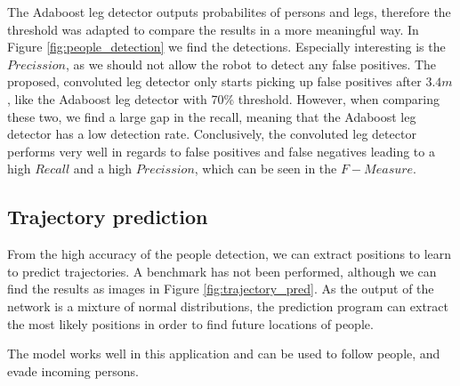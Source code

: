 The Adaboost leg detector outputs probabilites of persons and legs, therefore the threshold was adapted to compare the results in a more meaningful way. In Figure \ref{fig:people_detection} we find the detections. Especially interesting is the $Precission$, as we should not allow the robot to detect any false positives. The proposed, convoluted leg detector only starts picking up false positives after $3.4 m$, like the Adaboost leg detector with 70\% threshold. However, when comparing these two, we find a large gap in the recall, meaning that the Adaboost leg detector has a low detection rate.
Conclusively, the convoluted leg detector performs very well in regards to false positives and false negatives leading to a high $Recall$ and a high $Precission$, which can be seen in the $F-Measure$.


\subsection{Trajectory prediction}

From the high accuracy of the people detection, we can extract positions to learn to predict trajectories. A benchmark has not been performed, although we can find the results as images in Figure \ref{fig:trajectory_pred}. As the output of the network is a mixture of normal distributions, the prediction program can extract the most likely positions in order to find future locations of people.

The model works well in this application and can be used to follow people, and evade incoming persons. 